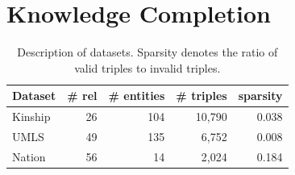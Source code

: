 \section{Knowledge Completion}
\label{sec:exp1}

\begin{table}[b]
\centering
\caption{\label{tbl:dataset}Description of datasets.
Sparsity denotes the ratio of valid triples to invalid triples.}
\begin{tabular}{l | r | r | r | r}
Dataset &  \# rel & \# entities & \# triples & sparsity \\ \hline
Kinship & 26 & 104  & 10,790 & 0.038 \\
UMLS & 49 &135  & 6,752 & 0.008 \\
Nation & 56 & 14  & 2,024 & 0.184 \\
\end{tabular}
\end{table}


